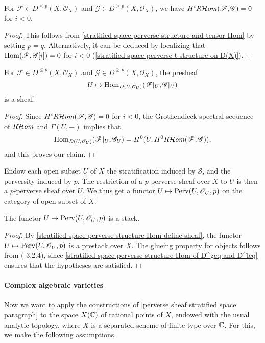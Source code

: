 \begin{corollary}\label{stratified space perverse structure Hom of D^geq and D^leq}
For $\mathscr{F}\in D^{\leq p}(X,\mathscr{O}_X)$ and $\mathscr{G}\in D^{\geq p}(X,\mathscr{O}_X)$, we have $H^iR\!\operatorname{\mathcal{H}\hspace*{-0.4pt}\textit{om}\hspace{0.5pt}}(\mathscr{F},\mathscr{G})=0$ for $i<0$.
\end{corollary}
\begin{proof}
This follows from \cref{stratified space perverse structure and tensor Hom} by setting $p=q$. Alternatively, it can be deduced by localizing that $\mathrm{Hom}(\mathscr{F},\mathscr{G}[i])=0$ for $i<0$ (\cref{stratified space perverse t-structure on D(X)}).
\end{proof}

\begin{corollary}\label{stratified space perverse structure Hom define sheaf}
For $\mathscr{F}\in D^{\leq p}(X,\mathscr{O}_X)$ and $\mathscr{G}\in D^{\geq p}(X,\mathscr{O}_X)$, the presheaf
\[U\mapsto\mathrm{Hom}_{D(U,\mathscr{O}_U)}(\mathscr{F}|_U,\mathscr{G}|_U)\]
is a sheaf.
\end{corollary}
\begin{proof}
Since $H^iR\!\operatorname{\mathcal{H}\hspace*{-0.4pt}\textit{om}\hspace{0.5pt}}(\mathscr{F},\mathscr{G})=0$ for $i<0$, the Grothendieck spectral sequence of $R\!\operatorname{\mathcal{H}\hspace*{-0.4pt}\textit{om}\hspace{0.5pt}}$ and $\Gamma(U,-)$ implies that
\[\mathrm{Hom}_{D(U,\mathscr{O}_U)}(\mathscr{F}|_U,\mathscr{G}_U)=H^0(U,H^0R\!\operatorname{\mathcal{H}\hspace*{-0.4pt}\textit{om}\hspace{0.5pt}}(\mathscr{F},\mathscr{G})),\]
and this proves our claim.
\end{proof}

Endow each open subset $U$ of $X$ the stratification induced by $\mathcal{S}$, and the perversity induced by $p$. The restriction of a $p$-perverse sheaf over $X$ to $U$ is then a $p$-perverse sheaf over $U$. We thus get a functor $U\mapsto\mathrm{Perv}(U,\mathscr{O}_U,p)$ on the category of open subset of $X$.
\begin{corollary}\label{stratified space perverse sheaf is stack}
The functor $U\mapsto\mathrm{Perv}(U,\mathscr{O}_U,p)$ is a stack.
\end{corollary}
\begin{proof}
By \cref{stratified space perverse structure Hom define sheaf}, the functor $U\mapsto\mathrm{Perv}(U,\mathscr{O}_U,p)$ is a prestack over $X$. The glueing property for objects follows from (\cite{BBD} 3.2.4), since \cref{stratified space perverse structure Hom of D^geq and D^leq} ensures that the hypotheses are satisfied.
\end{proof}

\paragraph{Complex algebraic varieties}\label{perverse sheaf complex variety paragraph}
Now we want to apply the constructions of \ref{perverse sheaf stratified space paragraph} to the space $X(\mathbb{C})$ of rational points of $X$, endowed with the usual analytic topology, where $X$ is a separated scheme of finite type over $\mathbb{C}$. For this, we make the following assumptions.

